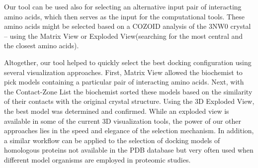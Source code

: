 \documentclass[twocolumn]{bmcart}%
\def\ExpView {Exploded View\xspace}
\def\MatView {Matrix View\xspace}
\def\CoZoList{Contact-Zone List\xspace}
\begin{document}
Our tool can be used also for selecting an alternative input pair of interacting amino acids, which then serves as the input for the computational tools.
These amino acids might be selected based on a COZOID analysis of the 3NW0 crystal -- using the \MatView or \ExpView (searching for the most central and the closest amino acids).

Altogether, our tool helped to quickly select the best docking configuration using several visualization approaches. 
First, \MatView allowed the biochemist to pick models containing a particular pair of interacting amino acids. 
Next, with the \CoZoList the biochemist sorted these models based on the similarity of their contacts with the original crystal structure. 
Using the 3D \ExpView, the best model was determined and confirmed. 
While an exploded view is available in some of the current 3D visualization tools, the power of our other approaches lies in the speed and elegance of the selection mechanism. 
In addition, a similar workflow can be applied to the selection of docking models of homologous proteins not available in the PDB database but very often used when different model organisms are employed in proteomic studies.





\end{document}
